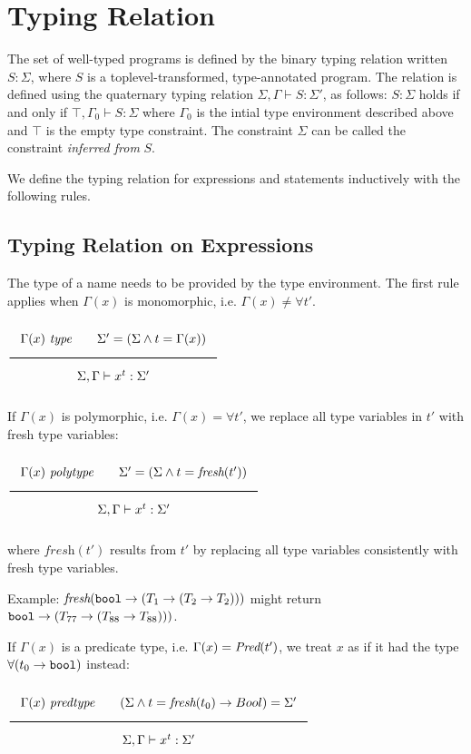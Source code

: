 \section{Typing Relation}

The set of well-typed programs is defined by the binary typing relation
written $S: \Sigma$, where $S$ is a toplevel-transformed, type-annotated program.
The relation is defined using the quaternary typing relation
$\Sigma, \Gamma \vdash S : \Sigma'$, as follows:
$S: \Sigma$ holds if and only if 
$\top, \Gamma_0 \vdash S : \Sigma$
where $\Gamma_0$ is the intial type environment described above and $\top$ is the empty
type constraint. The constraint $\Sigma$ can be called the constraint \emph{inferred from}
$S$. 

We define the typing relation for expressions and statements
inductively with the following rules.

\subsection{Typing Relation on Expressions}

The type of a name needs to be provided by the type environment. The first rule
applies when $\Gamma(x)$ is monomorphic, i.e. $\Gamma(x) \neq \forall t'$.

\noindent
$\Rule{\Gamma(x)\ \type \qquad
  \Sigma' = (\Sigma \wedge t = \Gamma(x))}{\Sigma, \Gamma \vdash x^t : \Sigma'}$

If $\Gamma(x)$ is polymorphic,  i.e. $\Gamma(x) = \forall t'$, we replace all type variables in
$t'$ with fresh type variables:

\noindent
$\Rule{\Gamma(x)\ \polytype \qquad
  \Sigma' = (\Sigma \wedge t = \textit{fresh}(t'))}{\Sigma, \Gamma \vdash x^t : \Sigma'}$

\noindent
where $\textit{fresh}(t')$ results from $t'$ by replacing all type variables consistently with
fresh type variables.

Example: $\textit{fresh}(\texttt{bool} \rightarrow (T_1 \rightarrow (T_2 \rightarrow T_2)))$
might return $\texttt{bool} \rightarrow (T_{77} \rightarrow (T_{88} \rightarrow T_{88})))$.

If $\Gamma(x)$ is a predicate type,  i.e. $\Gamma(x) = \textit{Pred}(t')$,
we treat $x$ as if it had the type $\forall (t_0 \rightarrow \texttt{bool})$ instead:

\noindent
$\Rule{\Gamma(x)\ \predtype \qquad
  (\Sigma \wedge t = \textit{fresh}(t_0) \rightarrow Bool) = \Sigma'}{\Sigma, \Gamma \vdash x^t : \Sigma'}$

